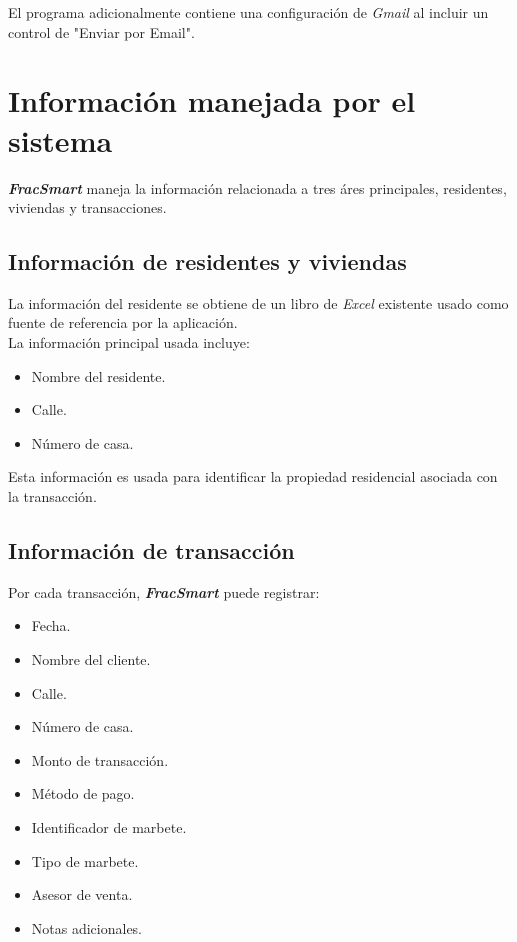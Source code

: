 \documentclass{article}
\begin{document}
\quad\quad El programa adicionalmente contiene una configuración de \textit{Gmail} al incluir un control de "Enviar por Email".



\newpage
\section{Información manejada por el sistema}
\quad\quad \textbf{\textit{FracSmart}} maneja la información relacionada a tres áres principales, residentes, viviendas y transacciones.\\

\subsection{Información de residentes y viviendas}
\quad\quad La información del residente se obtiene de un libro de \textit{Excel} existente usado como fuente de referencia por la aplicación.\\

\quad\quad La información principal usada incluye:
\begin{itemize}
    \item Nombre del residente.
    \item Calle.
    \item Número de casa.
\end{itemize}

\quad\quad Esta información es usada para identificar la propiedad residencial asociada con la transacción.

\subsection{Información de transacción}
\quad\quad Por cada transacción, \textbf{\textit{FracSmart}} puede registrar:
\begin{itemize}
    \item Fecha.
    \item Nombre del cliente.
    \item Calle.
    \item Número de casa.
    \item Monto de transacción.
    \item Método de pago.
    \item Identificador de marbete.
    \item Tipo de marbete.
    \item Asesor de venta.
    \item Notas adicionales.
\end{itemize}
\end{document}
